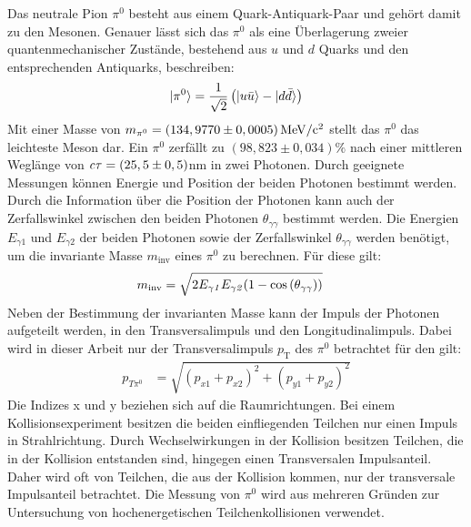 Das neutrale Pion $\pi^{0}$ besteht aus einem Quark-Antiquark-Paar und geh\"ort damit zu den Mesonen.
Genauer l\"asst sich das $\pi^{0}$ als eine \"Uberlagerung zweier quantenmechanischer Zust\"ande, bestehend aus $u$ und $d$ Quarks und den entsprechenden Antiquarks, beschreiben:
\begin{align}
\lvert\pi^{0}\rangle = \frac{1}{\sqrt{2}}\left(\lvert u\bar{u}\rangle-\lvert d\bar{d}\rangle\right) \label{eq:pi0state}
\end{align}
Mit einer Masse von $m_{\pi^{0}} = \left(134,9770\pm0,0005\right) \rm{MeV}/c^{2}$ \cite{book:pdg} stellt das $\pi^{0}$ das leichteste Meson dar.
Ein ${\pi^{0}}$ zerf{\"a}llt zu $\left( 98,823\pm0,034\right)\%$ nach einer mittleren Wegl\"ange von ${\it c\tau} = (25,5\pm0,5)$nm \cite{book:pdg} in zwei Photonen.
Durch geeignete Messungen k\"onnen Energie und Position der beiden Photonen bestimmt werden.
Durch die Information \"uber die Position der Photonen kann auch der Zerfallswinkel zwischen den beiden Photonen $\theta_{\gamma\gamma}$ bestimmt werden.
Die Energien $E_{\gamma1}$ und $E_{\gamma2}$ der beiden Photonen sowie der Zerfallswinkel $\theta_{\gamma\gamma}$ werden ben\"otigt, um die invariante Masse $m_{\text{inv}}$ eines $\pi^{0}$ zu berechnen.
F{\"u}r diese gilt:
\begin{align}
m_{\text{inv}} &= \sqrt{2E_{\gamma\it{1}}E_{\gamma\it{2}}(1-\cos\left( \theta_{\gamma\gamma}\right) )} \label{eq_invmass}
\end{align}
\newline
Neben der Bestimmung der invarianten Masse kann der Impuls der Photonen aufgeteilt werden, in den Transversalimpuls und den Longitudinalimpuls.
Dabei wird in dieser Arbeit nur der Transversalimpuls $p_\text{T}$ des $\pi^{0}$ betrachtet f\"ur den gilt:
\begin{align}
p_{T\pi^{0}} &= \sqrt{\left(p_{x1}+p_{x2}\right)^{2} +\left(p_{y1}+p_{y2}\right)^{2}} \label{eq_pt}
\end{align}
Die Indizes x und y beziehen sich auf die Raumrichtungen.
\newline
Bei einem Kollisionsexperiment besitzen die beiden einfliegenden Teilchen nur einen Impuls in Strahlrichtung.
Durch Wechselwirkungen in der Kollision besitzen Teilchen, die in der Kollision entstanden sind, hingegen einen Transversalen Impulsanteil.
Daher wird oft von Teilchen, die aus der Kollision kommen, nur der transversale Impulsanteil betrachtet.
\newline
Die Messung von $\pi^{0}$ wird aus mehreren Gr\"unden zur Untersuchung von hochenergetischen Teilchenkollisionen verwendet.
